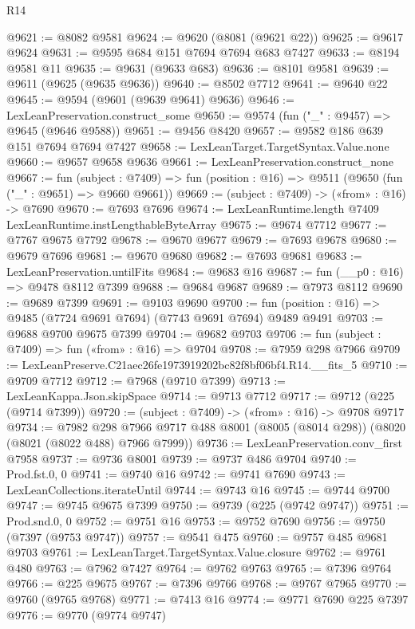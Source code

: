 \begin{lexlean}{R14}
\begin{coremodule}
@9621 := @8082 @9581
@9624 := @9620 (@8081 (@9621 @22))
@9625 := @9617 @9624
@9631 := @9595 @684 @151 @7694 @7694 @683 @7427
@9633 := @8194 @9581 @11
@9635 := @9631 (@9633 @683)
@9636 := @8101 @9581
@9639 := @9611 (@9625 (@9635 @9636))
@9640 := @8502 @7712
@9641 := @9640 @22
@9645 := @9594 (@9601 (@9639 @9641) @9636)
@9646 := LexLeanPreservation.construct_some
@9650 := @9574 (fun ("_" : @9457) => @9645 (@9646 @9588))
@9651 := @9456 @8420
@9657 := @9582 @186 @639 @151 @7694 @7694 @7427
@9658 := LexLeanTarget.TargetSyntax.Value.none
@9660 := @9657 @9658 @9636
@9661 := LexLeanPreservation.construct_none
@9667 := fun (subject : @7409) =>
  fun (position : @16) => @9511 (@9650 (fun ("_" : @9651) => @9660 @9661))
@9669 := (subject : @7409) -> («from» : @16) -> @7690
@9670 := @7693 @7696
@9674 := LexLeanRuntime.length @7409 LexLeanRuntime.instLengthableByteArray
@9675 := @9674 @7712
@9677 := @7767 @9675 @7792
@9678 := @9670 @9677
@9679 := @7693 @9678
@9680 := @9679 @7696
@9681 := @9670 @9680
@9682 := @7693 @9681
@9683 := LexLeanPreservation.untilFits
@9684 := @9683 @16
@9687 := fun (__p0 : @16) => @9478 @8112 @7399
@9688 := @9684 @9687
@9689 := @7973 @8112
@9690 := @9689 @7399
@9691 := @9103 @9690
@9700 := fun (position : @16) => @9485 (@7724 @9691 @7694) (@7743 @9691 @7694) @9489 @9491
@9703 := @9688 @9700 @9675 @7399
@9704 := @9682 @9703
@9706 := fun (subject : @7409) => fun («from» : @16) => @9704
@9708 := @7959 @298 @7966
@9709 := LexLeanPreserve.C21aec26fe1973919202bc82f8bf06bf4.R14.__fits_5
@9710 := @9709 @7712
@9712 := @7968 (@9710 @7399)
@9713 := LexLeanKappa.Json.skipSpace
@9714 := @9713 @7712
@9717 := @9712 (@225 (@9714 @7399))
@9720 := (subject : @7409) -> («from» : @16) -> @9708 @9717
@9734 := @7982
    @298
    @7966
    @9717
    @488
    @8001
    (@8005 (@8014 @298))
    (@8020 (@8021 (@8022 @488) @7966 @7999))
@9736 := LexLeanPreservation.conv_first @7958
@9737 := @9736 @8001
@9739 := @9737 @486 @9704
@9740 := Prod.fst.{0, 0}
@9741 := @9740 @16
@9742 := @9741 @7690
@9743 := LexLeanCollections.iterateUntil
@9744 := @9743 @16
@9745 := @9744 @9700
@9747 := @9745 @9675 @7399
@9750 := @9739 (@225 (@9742 @9747))
@9751 := Prod.snd.{0, 0}
@9752 := @9751 @16
@9753 := @9752 @7690
@9756 := @9750 (@7397 (@9753 @9747))
@9757 := @9541 @475
@9760 := @9757 @485 @9681 @9703
@9761 := LexLeanTarget.TargetSyntax.Value.closure
@9762 := @9761 @480
@9763 := @7962 @7427
@9764 := @9762 @9763
@9765 := @7396 @9764
@9766 := @225 @9675
@9767 := @7396 @9766
@9768 := @9767 @7965
@9770 := @9760 (@9765 @9768)
@9771 := @7413 @16
@9774 := @9771 @7690 @225 @7397
@9776 := @9770 (@9774 @9747)

\end{coremodule}
\end{lexlean}
